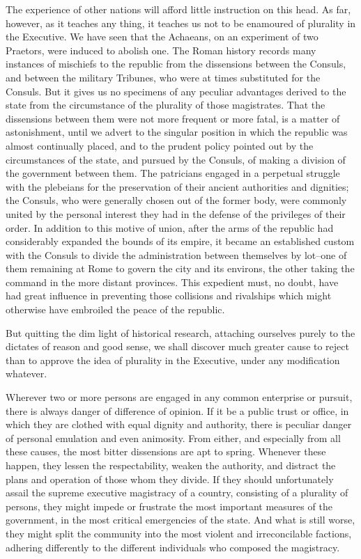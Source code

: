 The experience of other nations will afford little instruction on this head. As far, however, as it teaches any thing, it teaches us not to be enamoured of plurality in the Executive. We have seen that the Achaeans, on an experiment of two Praetors, were induced to abolish one. The Roman history records many instances of mischiefs to the republic from the dissensions between the Consuls, and between the military Tribunes, who were at times substituted for the Consuls. But it gives us no specimens of any peculiar advantages derived to the state from the circumstance of the plurality of those magistrates. That the dissensions between them were not more frequent or more fatal, is a matter of astonishment, until we advert to the singular position in which the republic was almost continually placed, and to the prudent policy pointed out by the circumstances of the state, and pursued by the Consuls, of making a division of the government between them. The patricians engaged in a perpetual struggle with the plebeians for the preservation of their ancient authorities and dignities; the Consuls, who were generally chosen out of the former body, were commonly united by the personal interest they had in the defense of the privileges of their order. In addition to this motive of union, after the arms of the republic had considerably expanded the bounds of its empire, it became an established custom with the Consuls to divide the administration between themselves by lot--one of them remaining at Rome to govern the city and its environs, the other taking the command in the more distant provinces. This expedient must, no doubt, have had great influence in preventing those collisions and rivalships which might otherwise have embroiled the peace of the republic.

But quitting the dim light of historical research, attaching ourselves purely to the dictates of reason and good sense, we shall discover much greater cause to reject than to approve the idea of plurality in the Executive, under any modification whatever.

Wherever two or more persons are engaged in any common enterprise or pursuit, there is always danger of difference of opinion. If it be a public trust or office, in which they are clothed with equal dignity and authority, there is peculiar danger of personal emulation and even animosity. From either, and especially from all these causes, the most bitter dissensions are apt to spring. Whenever these happen, they lessen the respectability, weaken the authority, and distract the plans and operation of those whom they divide. If they should unfortunately assail the supreme executive magistracy of a country, consisting of a plurality of persons, they might impede or frustrate the most important measures of the government, in the most critical emergencies of the state. And what is still worse, they might split the community into the most violent and irreconcilable factions, adhering differently to the different individuals who composed the magistracy.

